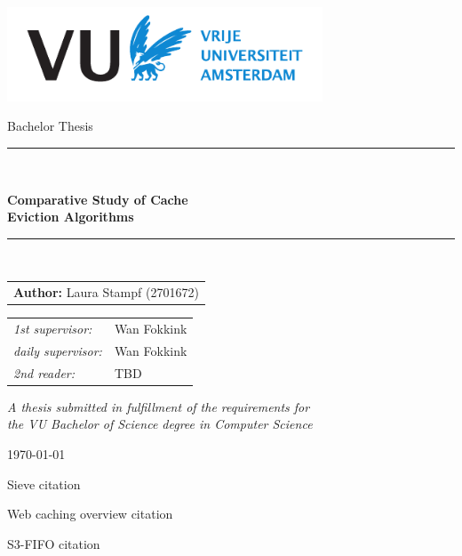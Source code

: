 \documentclass[a4paper, 11pt]{report}
\renewcommand{\chaptername}{} %
\begin{document}
\thispagestyle{empty}

\begin{center}
\vspace{1mm}
\includegraphics[height=28mm]{resources/logo-vua.pdf}
\vspace{1cm}

{\Large Bachelor Thesis}
\vspace{1cm}

\rule{.9\linewidth}{.6pt}\\
\vspace{0.4cm}
{\huge \bfseries Comparative Study of Cache \\ Eviction Algorithms\par}
\vspace{0.4cm}
\rule{.9\linewidth}{.6pt}\\[1.5cm]
\vspace*{2mm}
{\Large

\begin{tabular}{l}
{\bf Author:} Laura Stampf (2701672)
\end{tabular}
}

\vspace*{1.5cm}

\begin{tabular}{ll}
{\it 1st supervisor:} & Wan Fokkink \\
{\it daily supervisor:} & Wan Fokkink \\
{\it 2nd reader:} & TBD \\
\end{tabular}

\vspace*{2cm}
\textit{A thesis submitted in fulfillment of the requirements for\\ the VU Bachelor
of Science degree in Computer Science }
\vspace*{1cm}

\today %
\end{center}

\pagestyle{fancy}
\fancyhead{} %
\fancyhead[R]{ \leftmark}

\newpage
\tableofcontents

Sieve citation\cite{sieve}

Web caching overview citation\cite{web-cache-overview}

S3-FIFO citation\cite{s3-fifo}

\newpage
\newpage
\newpage
\newpage
\newpage

\end{document}
